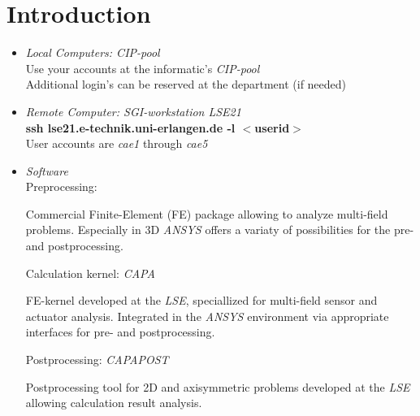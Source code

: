 \section{Introduction}
%
\begin{itemize}
%
\item {\em Local Computers: CIP-pool}\\
%
Use your accounts at the informatic's {\em CIP-pool}\\ 
Additional login's can be reserved at the department (if needed)\\
%
\item {\em Remote Computer: SGI-workstation LSE21}\\
%
{\bf  ssh lse21.e-technik.uni-erlangen.de -l $<$userid$>$}\\ 
User accounts are {\em cae1} through {\em cae5} 
%
\item {\em Software}\\
%
Preprocessing:\hspace{5ex}{\em ANSYS}\\
\begin{print}
Commercial Finite-Element (FE) package allowing to analyze multi-field problems. Especially in 3D {\em ANSYS} offers a variaty of possibilities for the pre- and postprocessing.\\
\end{print}
Calculation kernel: {\em CAPA}\\
\begin{print}
FE-kernel developed at the {\em LSE}, speciallized for multi-field sensor and actuator analysis. Integrated in the {\em ANSYS} environment via appropriate interfaces for pre- and postprocessing.\\
\end{print}
Postprocessing:\hspace{3ex} {\em CAPAPOST}\\
\begin{print}
Postprocessing tool for 2D and axisymmetric problems developed at the {\em LSE} allowing calculation result analysis.\\
\end{print}
\end{itemize}
%
\newslide
%
